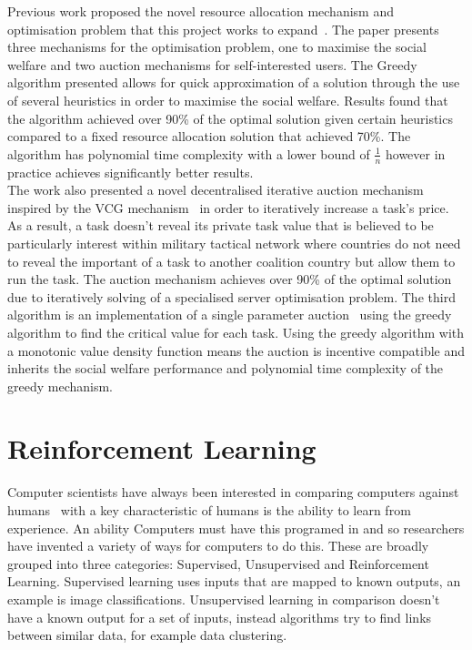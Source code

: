 Previous work proposed the novel resource allocation mechanism and optimisation problem that this project works to
expand~\citep{FlexibleResourceAllocation}. The paper presents three mechanisms for the optimisation problem,
one to maximise the social welfare and two auction mechanisms for self-interested users. The Greedy algorithm presented
allows for quick approximation of a solution through the use of several heuristics in order to maximise the social
welfare. Results found that the algorithm achieved over 90\% of the optimal solution given certain heuristics compared
to a fixed resource allocation solution that achieved 70\%. The algorithm has polynomial time complexity with a lower
bound of $\frac{1}{n}$ however in practice achieves significantly better results. \\
The work also presented a novel decentralised iterative auction mechanism inspired by the VCG
mechanism~\citep{vickrey, Clarke, groves} in order to iteratively increase a task's price. As a result, a task doesn't
reveal its private task value that is believed to be particularly interest within military tactical network where countries
do not need to reveal the important of a task to another coalition country but allow them to run the task. The auction
mechanism achieves over 90\% of the optimal solution due to iteratively solving of a specialised server optimisation problem.
The third algorithm is an implementation of a single parameter auction~\citep{nisan2007algorithmic_critical_value} using
the greedy algorithm to find the critical value for each task. Using the greedy algorithm with a monotonic value density
function means the auction is incentive compatible and inherits the social welfare performance and polynomial time
complexity of the greedy mechanism.

\section{Reinforcement Learning}
\label{sec:reinforcement-learning}
Computer scientists have always been interested in comparing computers against humans~\citep{turing1950computing} with a
key characteristic of humans is the ability to learn from experience. An ability Computers must have this programed in
and so researchers have invented a variety of ways for computers to do this. These are broadly
grouped into three categories: Supervised, Unsupervised and Reinforcement Learning. Supervised learning uses inputs
that are mapped to known outputs, an example is image classifications. Unsupervised learning in comparison doesn't have
a known output for a set of inputs, instead algorithms try to find links between similar data, for example data
clustering.

